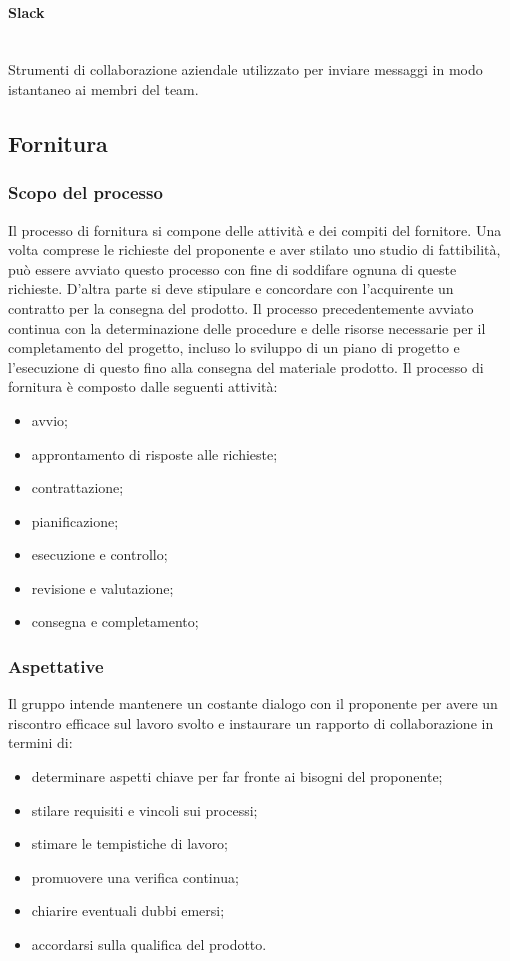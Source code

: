 \paragraph{Slack} \mbox{}\\
Strumenti di collaborazione aziendale utilizzato per inviare messaggi in modo istantaneo ai membri del team.
\subsection{Fornitura}
\subsubsection{Scopo del processo}
Il processo di fornitura si compone delle attività e dei compiti del fornitore. Una volta comprese le richieste del proponente e aver stilato uno studio di fattibilità, può essere avviato questo processo con fine di soddifare ognuna di queste richieste. D'altra parte si deve stipulare e concordare con l'acquirente un contratto per la consegna del prodotto.
Il processo precedentemente avviato continua con la determinazione delle procedure e delle risorse necessarie per il completamento del progetto, incluso lo sviluppo di un piano di progetto e l'esecuzione di questo fino alla consegna del materiale prodotto.
Il processo di fornitura è composto dalle seguenti attività:
\begin{itemize}
	\item avvio;
	\item approntamento di risposte alle richieste;
	\item contrattazione;
	\item pianificazione;
	\item esecuzione e controllo;
	\item revisione e valutazione;
	\item consegna e completamento;
\end{itemize}
\subsubsection{Aspettative}
Il gruppo intende mantenere un costante dialogo con il proponente per avere un riscontro efficace sul lavoro svolto e instaurare un rapporto di collaborazione in termini di:
\begin{itemize}
	\item determinare aspetti chiave per far fronte ai bisogni del proponente;
	\item stilare requisiti e vincoli sui processi;
	\item stimare le tempistiche di lavoro;
	\item promuovere una verifica continua;
	\item chiarire eventuali dubbi emersi;
	\item accordarsi sulla qualifica del prodotto.
\end{itemize}
